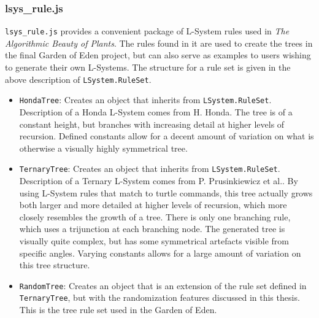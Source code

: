 \documentclass{article}
\newcommand{\tab}{\hspace*{2em}}
\begin{document}
            \subsubsection{lsys\_rule.js}
    \tab \verb|lsys_rule.js| provides a convenient package of L-System rules used in \emph{The
Algorithmic Beauty of Plants}\cite{abp96}. The rules found in it are used to create the trees in the final
Garden of Eden project, but can also serve as examples to users wishing to generate their own
L-Systems. The structure for a rule set is given in the above description of
\verb|LSystem.RuleSet|.
    \begin{itemize}
        \item \verb|HondaTree|: Creates an object that inherits from \verb|LSystem.RuleSet|.
Description of a Honda L-System comes from H. Honda\cite{honda71}. The tree is of a constant
height, but branches with increasing detail at higher levels of recursion. Defined constants allow
for a decent amount of variation on what is otherwise a visually highly symmetrical tree.

        \item \verb|TernaryTree|: Creates an object that inherits from \verb|LSystem.RuleSet|.
Description of a Ternary L-System comes from P. Prusinkiewicz et al.\cite{abp96}. By using L-System
rules that match to turtle commands, this tree actually grows both larger and more detailed at
higher levels of recursion, which more closely resembles the growth of a tree. There is only one
branching rule, which uses a trijunction at each branching node. The generated tree is
visually quite complex, but has some symmetrical artefacts visible from specific angles. Varying
constants allows for a large amount of variation on this tree structure.

        \item \verb|RandomTree|: Creates an object that is an extension of the rule set defined in
\verb|TernaryTree|, but with the randomization features discussed in this thesis. This is the tree
rule set used in the Garden of Eden.

    \end{itemize}
\end{document}
